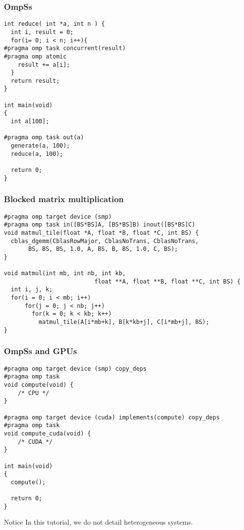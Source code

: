 \begin{frame}[fragile]
  \frametitle{OmpSs}
  \begin{block}{}
\begin{lstlisting}
int reduce( int *a, int n ) {
  int i, result = 0;
  for(i= 0; i < n; i++){
#pragma omp task concurrent(result)
#pragma omp atomic
    result += a[i];
  }
  return result;
}

int main(void)
{
  int a[100];

#pragma omp task out(a)
  generate(a, 100);
  reduce(a, 100);

  return 0;
}
\end{lstlisting}
  \end{block}
\end{frame}
\begin{frame}[fragile]
  \frametitle{Blocked matrix multiplication}
  \begin{block}{}
\begin{lstlisting}
#pragma omp target device (smp) 
#pragma omp task in([BS*BS]A, [BS*BS]B) inout([BS*BS]C)
void matmul_tile(float *A, float *B, float *C, int BS) {
  cblas_dgemm(CblasRowMajor, CblasNoTrans, CblasNoTrans,
       BS, BS, BS, 1.0, A, BS, B, BS, 1.0, C, BS);
}

void matmul(int mb, int nb, int kb,
                          float **A, float **B, float **C, int BS) { 
  int i, j, k;
  for(i = 0; i < mb; i++)
      for(j = 0; j < nb; j++)
        for(k = 0; k < kb; k++)
          matmul_tile(A[i*mb+k], B[k*kb+j], C[i*mb+j], BS);
}
\end{lstlisting}
\end{block}
\end{frame}
\begin{frame}[fragile]
  \frametitle{OmpSs and GPUs}
  \begin{block}{}
\begin{lstlisting}
#pragma omp target device (smp) copy_deps
#pragma omp task 
void compute(void) {
    /* CPU */
}

#pragma omp target device (cuda) implements(compute) copy_deps
#pragma omp task 
void compute_cuda(void) {
    /* CUDA */
}

int main(void)
{
  compute();

  return 0;
}
\end{lstlisting}
  \end{block}
%
\pause
%
  \begin{alertblock}{Notice}
    In this tutorial, we do not detail heterogeneous systems.
  \end{alertblock}
\end{frame}
